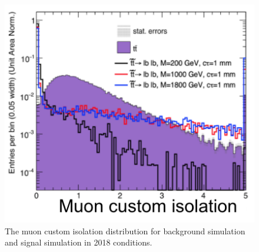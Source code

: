 \begin{figure}[hbtp]
\centering
\includegraphics[scale=0.5]{figures/selection/MuonCustomIso_TTbar_Signal.png}
\caption{The muon custom isolation distribution for \ttbar background simulation and signal simulation in 2018 conditions.}
\label{iso_signal_bg}
\end{figure}